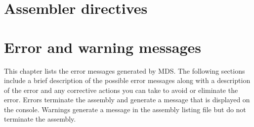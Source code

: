 \section{Assembler directives}
    

\section{Error and warning messages}
    This chapter lists the error messages generated by MDS. The following sections include a brief description of the possible error messages along with a description of the error and any corrective actions you can take to avoid or eliminate the error. Errors terminate the assembly and generate a message that is displayed on the console. Warnings generate a message in the assembly listing file but do not terminate the assembly.

